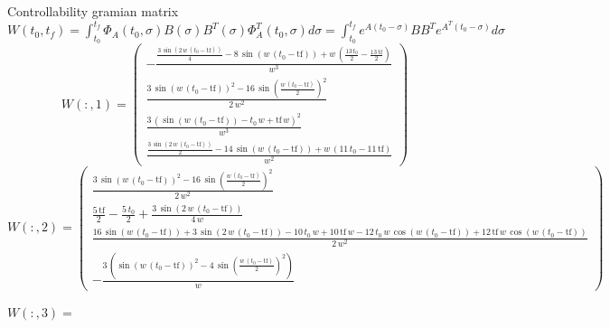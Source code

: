 \documentclass{article}
\begin{document}
Controllability gramian matrix $W(t_0, t_f) = \int_{t_0}^{t_f} \Phi_A(t_0, \sigma) B(\sigma)B^T(\sigma) \Phi_A^T (t_0, \sigma)d \sigma = \int_{t_0}^{t_f} e^{A(t_0- \sigma)} B B^T e^{A^T(t_0- \sigma)} d \sigma$ 
$$W(:, 1) = \left(\begin{array}{c} -\frac{\frac{3\,\sin\left(2\,w\,\left(t_{0}-\mathrm{tf}\right)\right)}{4}-8\,\sin\left(w\,\left(t_{0}-\mathrm{tf}\right)\right)+w\,\left(\frac{13\,t_{0}}{2}-\frac{13\,\mathrm{tf}}{2}\right)}{w^3}\\ \frac{3\,{\sin\left(w\,\left(t_{0}-\mathrm{tf}\right)\right)}^2-16\,{\sin\left(\frac{w\,\left(t_{0}-\mathrm{tf}\right)}{2}\right)}^2}{2\,w^2}\\ \frac{3\,{\left(\sin\left(w\,\left(t_{0}-\mathrm{tf}\right)\right)-t_{0}\,w+\mathrm{tf}\,w\right)}^2}{w^3}\\ \frac{\frac{3\,\sin\left(2\,w\,\left(t_{0}-\mathrm{tf}\right)\right)}{2}-14\,\sin\left(w\,\left(t_{0}-\mathrm{tf}\right)\right)+w\,\left(11\,t_{0}-11\,\mathrm{tf}\right)}{w^2} \end{array}\right)$$
$$W(:, 2) = \left(\begin{array}{c} \frac{3\,{\sin\left(w\,\left(t_{0}-\mathrm{tf}\right)\right)}^2-16\,{\sin\left(\frac{w\,\left(t_{0}-\mathrm{tf}\right)}{2}\right)}^2}{2\,w^2}\\ \frac{5\,\mathrm{tf}}{2}-\frac{5\,t_{0}}{2}+\frac{3\,\sin\left(2\,w\,\left(t_{0}-\mathrm{tf}\right)\right)}{4\,w}\\ \frac{16\,\sin\left(w\,\left(t_{0}-\mathrm{tf}\right)\right)+3\,\sin\left(2\,w\,\left(t_{0}-\mathrm{tf}\right)\right)-10\,t_{0}\,w+10\,\mathrm{tf}\,w-12\,t_{0}\,w\,\cos\left(w\,\left(t_{0}-\mathrm{tf}\right)\right)+12\,\mathrm{tf}\,w\,\cos\left(w\,\left(t_{0}-\mathrm{tf}\right)\right)}{2\,w^2}\\ -\frac{3\,\left({\sin\left(w\,\left(t_{0}-\mathrm{tf}\right)\right)}^2-4\,{\sin\left(\frac{w\,\left(t_{0}-\mathrm{tf}\right)}{2}\right)}^2\right)}{w} \end{array}\right)$$

$W(:,3) = $
\end{document}
